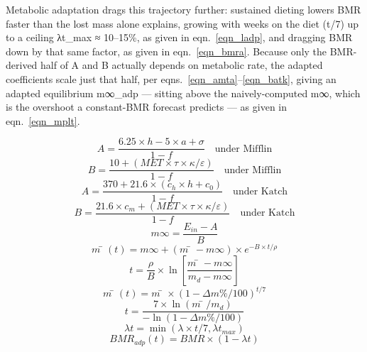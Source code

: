Metabolic adaptation drags this trajectory further: sustained dieting lowers BMR faster than the lost mass alone explains, growing with weeks on the diet (t/7) up to a ceiling λt\_max ≈ 10–15\%, as given in eqn.~\eqref{eqn_ladp}, and dragging BMR down by that same factor, as given in eqn.~\eqref{eqn_bmra}. Because only the BMR-derived half of A and B actually depends on metabolic rate, the adapted coefficients scale just that half, per eqns.~\eqref{eqn_amta}–\eqref{eqn_batk}, giving an adapted equilibrium m∞\_adp — sitting above the naively-computed m∞, which is the overshoot a constant-BMR forecast predicts — as given in eqn.~\eqref{eqn_mplt}.

\begin{equation}
\label{eqn_amif}
A = \frac{6.25×h − 5×a + σ}{1 − f} \quad \text{under Mifflin}
\end{equation}
\begin{equation}
\label{eqn_bmif}
B = \frac{10 + (MET × τ × κ / ε)}{1 − f} \quad \text{under Mifflin}
\end{equation}
\begin{equation}
\label{eqn_akat}
A = \frac{370 + 21.6×(c_{h}×h + c_{0})}{1 − f} \quad \text{under Katch}
\end{equation}
\begin{equation}
\label{eqn_bkat}
B = \frac{21.6×c_{m} + (MET × τ × κ / ε)}{1 − f} \quad \text{under Katch}
\end{equation}
\begin{equation}
\label{eqn_meqm}
m∞ = \frac{E_{in} − A}{B}
\end{equation}
\begin{equation}
\label{eqn_mdec}
m̄(t) = m∞ + (m̄ − m∞) × e^{−B×t/ρ}
\end{equation}
\begin{equation}
\label{eqn_tday}
t = \frac{ρ}{B} × \ln\!\left[ \frac{m̄ − m∞}{m_{d} − m∞} \right]
\end{equation}
\begin{equation}
\label{eqn_mprp}
m̄(t) = m̄ × (1 − Δm\%/100)^{t/7}
\end{equation}
\begin{equation}
\label{eqn_tprp}
t = \frac{7 × \ln(m̄ / m_{d})}{−\ln(1 − Δm\%/100)}
\end{equation}
\begin{equation}
\label{eqn_ladp}
λt = \min(λ × t/7, λt_{max})
\end{equation}
\begin{equation}
\label{eqn_bmra}
BMR_{adp}(t) = BMR × (1 − λt)
\end{equation}

